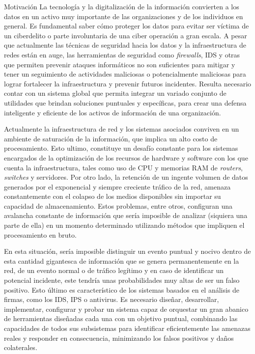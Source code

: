     \begin{section}{Motivación}
        La tecnología y la digitalización de la información convierten a los datos en un activo muy importante de las organizaciones y de los individuos en general. Es fundamental saber cómo proteger los datos para evitar ser víctima de un ciberdelito o parte involuntaria de una ciber operación a gran escala. A pesar que actualmente las técnicas de seguridad hacia los datos y la infraestructura de redes están en auge, las herramientas de seguridad como \textit{firewalls}, IDS y otras que permiten prevenir ataques informáticos no son suficientes para mitigar y tener un seguimiento de actividades maliciosas o potencialmente maliciosas para lograr fortalecer la infraestructura y prevenir futuros incidentes. Resulta necesario contar con un sistema global que permita integrar un variado conjunto de utilidades que brindan soluciones puntuales y específicas, para crear una defensa inteligente y eficiente de los activos de información de una organización. \par
        Actualmente la infraestructura de red y los sistemas asociados conviven en un ambiente de saturación de la información, que implica un alto costo de procesamiento. Esto ultimo, constituye un desafío constante para los sistemas encargados de la optimización de los recursos de hardware y software con los que cuenta la infraestructura, tales como uso de CPU y memorias RAM de \textit{routers}, \textit{switches} y servidores. Por otro lado, la retención de un ingente volumen de datos generados por el exponencial y siempre creciente tráfico de la red, amenaza constantemente con el colapso de los medios disponibles sin importar su capacidad de almacenamiento. Estos problemas, entre otros, configuran una avalancha constante de información que sería imposible de analizar (siquiera una parte de ella) en un momento determinado utilizando métodos que impliquen el procesamiento en bruto.  \par
        En esta situación, sería imposible distinguir un evento puntual y nocivo dentro de esta cantidad gigantesca de información que se genera permanentemente en la red, de un evento normal o de tráfico legítimo y en caso de identificar un potencial incidente, este tendría unas probabilidades muy altas de ser un falso positivo. Esto último es característico de los sistemas basados en el análisis de firmas, como los IDS, IPS o antivirus. Es necesario diseñar, desarrollar, implementar, configurar y probar un sistema capaz de orquestar un gran abanico de herramientas diseñadas cada una con un objetivo puntual, combinando las capacidades de todos sus subsistemas para identificar eficientemente las amenazas reales y responder en consecuencia, minimizando los falsos positivos y daños colaterales.

    \end{section}